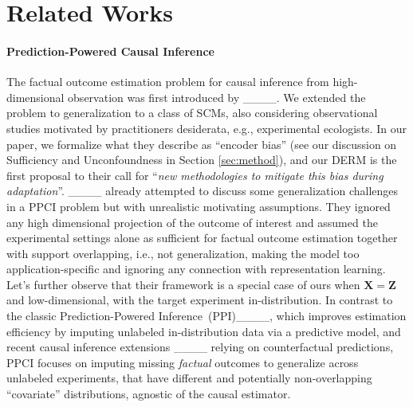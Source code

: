 \section{Related Works}
\label{sec:relatedwork}

\paragraph{Prediction-Powered Causal Inference}
The factual outcome estimation problem for causal inference from high-dimensional observation was first introduced by ____. We extended the problem to generalization to a class of SCMs, also considering observational studies motivated by practitioners desiderata, e.g., experimental ecologists. In our paper, we formalize what they describe as ``encoder bias'' (see our discussion on Sufficiency and Unconfoundness in Section \ref{sec:method}), and our DERM is the first proposal to their call for ``\textit{new methodologies to mitigate this bias during adaptation}''.
____ already attempted to discuss some generalization challenges in a PPCI problem but with unrealistic motivating assumptions. They ignored any high dimensional projection of the outcome of interest and assumed the experimental settings alone as sufficient for factual outcome estimation together with support overlapping, i.e., not generalization, making the model too application-specific and ignoring any connection with representation learning. Let's further observe that their framework is a special case of ours when $\bm{X}=\bm{Z}$ and low-dimensional, with the target experiment in-distribution. In contrast to the classic Prediction-Powered Inference~(PPI)____, which improves estimation efficiency by imputing unlabeled in-distribution data via a predictive model, and recent causal inference extensions ____ relying on counterfactual predictions, PPCI focuses on imputing missing \textit{factual} outcomes to generalize across unlabeled experiments, that have different and potentially non-overlapping ``covariate'' distributions, agnostic of the causal estimator. 

